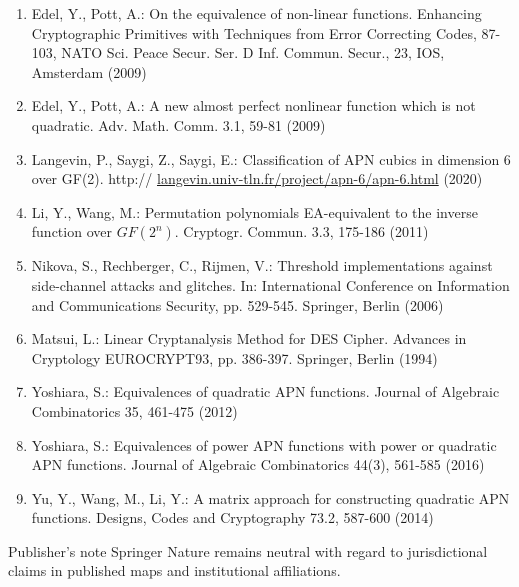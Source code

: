 \documentclass[10pt]{article}
\begin{document}
\begin{enumerate}
  \item Edel, Y., Pott, A.: On the equivalence of non-linear functions. Enhancing Cryptographic Primitives with Techniques from Error Correcting Codes, 87-103, NATO Sci. Peace Secur. Ser. D Inf. Commun. Secur., 23, IOS, Amsterdam (2009)
  \item Edel, Y., Pott, A.: A new almost perfect nonlinear function which is not quadratic. Adv. Math. Comm. 3.1, 59-81 (2009)
  \item Langevin, P., Saygi, Z., Saygi, E.: Classification of APN cubics in dimension 6 over GF(2). http:// \href{http://langevin.univ-tln.fr/project/apn-6/apn-6.html}{langevin.univ-tln.fr/project/apn-6/apn-6.html} (2020)
  \item Li, Y., Wang, M.: Permutation polynomials EA-equivalent to the inverse function over $G F\left(2^{n}\right)$. Cryptogr. Commun. 3.3, 175-186 (2011)
  \item Nikova, S., Rechberger, C., Rijmen, V.: Threshold implementations against side-channel attacks and glitches. In: International Conference on Information and Communications Security, pp. 529-545. Springer, Berlin (2006)
  \item Matsui, L.: Linear Cryptanalysis Method for DES Cipher. Advances in Cryptology EUROCRYPT93, pp. 386-397. Springer, Berlin (1994)
  \item Yoshiara, S.: Equivalences of quadratic APN functions. Journal of Algebraic Combinatorics 35, 461-475 (2012)
  \item Yoshiara, S.: Equivalences of power APN functions with power or quadratic APN functions. Journal of Algebraic Combinatorics 44(3), 561-585 (2016)
  \item Yu, Y., Wang, M., Li, Y.: A matrix approach for constructing quadratic APN functions. Designs, Codes and Cryptography 73.2, 587-600 (2014)
\end{enumerate}

Publisher's note Springer Nature remains neutral with regard to jurisdictional claims in published maps and institutional affiliations.
\end{document}
